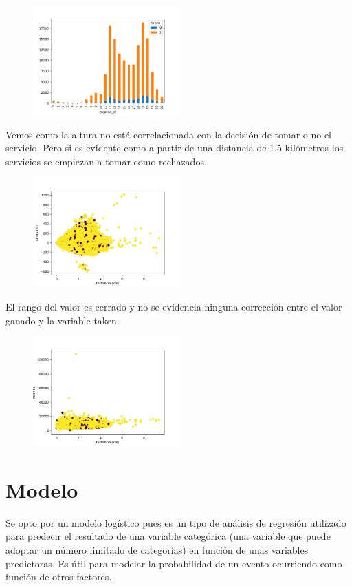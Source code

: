 \documentclass[10pt,a4paper]{article}
\begin{document}
		\begin{figure}[h]
			\centering
			\includegraphics[width=0.5\textwidth]{../Img/Figure_3}
		\end{figure}
		Vemos como la altura no está correlacionada con la decisión de tomar o no el servicio. Pero si es evidente como a partir de una distancia de 1.5 kilómetros los servicios se empiezan a tomar como rechazados.\\
		
		\begin{figure}[h]
			\centering
			\includegraphics[width=0.5\textwidth]{../Img/Figure_4}
		\end{figure}
		El rango del valor es cerrado y no se evidencia ninguna corrección entre el valor ganado y la variable taken.
		\begin{figure}[h]
			\centering
			\includegraphics[width=0.5\textwidth]{../Img/Figure_5}
		\end{figure}
	\section{Modelo}	
		Se opto por un modelo logístico pues es un tipo de análisis de regresión utilizado para predecir el resultado de una variable categórica (una variable que puede adoptar un número limitado de categorías) en función de unas variables predictoras. Es útil para modelar la probabilidad de un evento ocurriendo como función de otros factores.\\
		
\end{document}
